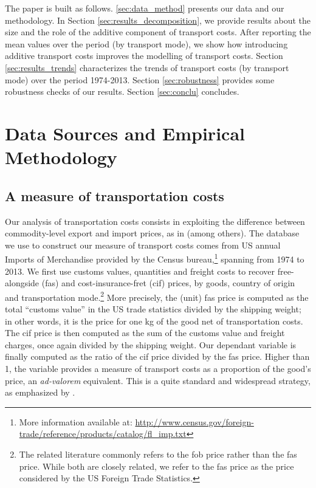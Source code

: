 \documentclass[a4paper,11pt]{article}
\begin{document}
The paper is built as follows. \ref{sec:data_method} presents our data and our  methodology. In Section \ref{sec:results_decomposition}, we provide results about the size and the role of the additive component of transport costs. After reporting the mean values over the period (by transport mode), we show how introducing additive transport costs improves the modelling of transport costs. Section \ref{sec:results_trends} characterizes the trends of transport costs (by transport mode) over the period 1974-2013. Section \ref{sec:robustness} provides some robustness checks of our results. Section \ref{sec:conclu} concludes.



\section{Data Sources and Empirical Methodology \label{sec:data_method}}

\subsection{A measure of transportation costs}

Our analysis of transportation costs consists in exploiting the difference between commodity-level export and import prices, as in \cite{hummels2007} (among others). The database we use to construct our measure of transport costs comes from US annual Imports of Merchandise provided by the Census bureau,\footnote{More information available at: \url{http://www.census.gov/foreign-trade/reference/products/catalog/fl_imp.txt}} spanning from 1974 to 2013. We first use customs values, quantities and freight costs to recover free-alongside (fas) and cost-insurance-fret (cif) prices, by goods, country of origin and transportation mode.\footnote{The related literature commonly refers to the fob price rather than the fas price. While both are closely related, we refer to the fas price as the price considered by the US Foreign Trade Statistics.} More precisely, the (unit) fas price is computed as the total ``customs value'' in the US trade statistics divided by the shipping weight; in other words, it is the price for one kg of the good net of transportation costs. The cif price is then computed as the sum of the customs value and freight charges, once again divided by the shipping weight. Our dependant variable is finally computed as the ratio of the cif price divided by the fas price. Higher than 1, the variable provides a measure of transport costs as a proportion of the good's price, an \emph{ad-valorem} equivalent. This is a quite standard and widespread strategy, as emphasized by \citet{anderson_wincoop_jel}.
\end{document}
